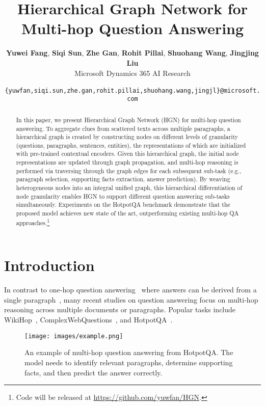 \documentclass[11pt,a4paper]{article}
\title{Hierarchical Graph Network for Multi-hop Question Answering}
\author{\textbf{Yuwei Fang},\hspace{1mm} \textbf{Siqi Sun},\hspace{1mm} \textbf{Zhe Gan},\hspace{1mm} \textbf{Rohit Pillai},\hspace{1mm} \textbf{Shuohang Wang},\hspace{1mm} \textbf{Jingjing Liu}\\
Microsoft Dynamics 365 AI Research\\
{\tt \small{ \{yuwfan,siqi.sun,zhe.gan,rohit.pillai,shuohang.wang,jingjl\}@microsoft.com}}}
\date{}
\begin{document}
\maketitle
\begin{abstract}
  In this paper, we present Hierarchical Graph Network (HGN) for multi-hop question answering. To aggregate clues from scattered texts across multiple paragraphs, a hierarchical graph is created by constructing nodes on different levels of granularity (questions, paragraphs, sentences, entities), the representations of which are initialized with pre-trained contextual encoders. Given this hierarchical graph, the initial node representations are updated through graph propagation, and multi-hop reasoning is performed via traversing through the graph edges for each subsequent sub-task (e.g., paragraph selection, supporting facts extraction, answer prediction). By weaving heterogeneous nodes into an integral unified graph, this hierarchical differentiation of node granularity enables HGN to support different question answering sub-tasks simultaneously. Experiments on the HotpotQA benchmark demonstrate that the proposed model achieves new state of the art, outperforming existing multi-hop QA approaches.\footnote{Code will be released at \href{https://github.com/yuwfan/HGN}{https://github.com/yuwfan/HGN}.}
\end{abstract}

\section{Introduction}

In contrast to one-hop question answering~\cite{rajpurkar2016squad,trischler2016newsqa,lai2017race} where answers can be derived from a single paragraph~\cite{matchlstm2016,bidaf,liu2017stochastic,devlin2018bert}, many recent studies on question answering focus on multi-hop reasoning across multiple documents or paragraphs. Popular tasks include WikiHop~\cite{welbl2018constructing}, ComplexWebQuestions~\cite{talmor2018web}, and HotpotQA~\cite{yang2018hotpotqa}.

\begin{figure}[t!]
\centering
{\texttt{[image: images/example.png]}}
\caption{\label{fig:example_question} An example of multi-hop question answering from HotpotQA. The model needs to identify relevant paragraphs, determine supporting facts, and then predict the answer correctly.}
\end{figure}
\end{document}
